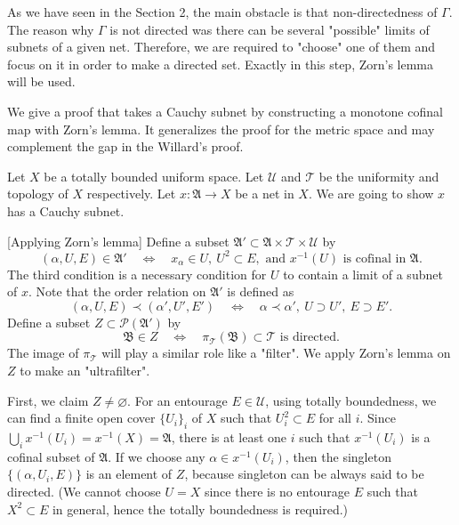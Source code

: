 \documentclass[11pt]{amsart}
\begin{document}
As we have seen in the Section 2, the main obstacle is that non-directedness of $\Gamma$.
The reason why $\Gamma$ is not directed was there can be several "possible" limits of subnets of a given net.
Therefore, we are required to "choose" one of them and focus on it in order to make a directed set.
Exactly in this step, Zorn's lemma will be used.
 
We give a proof that takes a Cauchy subnet by constructing a monotone cofinal map with Zorn's lemma.
It generalizes the proof for the metric space and may complement the gap in the Willard's proof.

\begin{pf}[1 of Theorem 1.1]
Let $X$ be a totally bounded uniform space.
Let $\mathcal{U}$ and $\mathcal{T}$ be the uniformity and topology of $X$ respectively.
Let $x:\mathfrak{A}\to X$ be a net in $X$.
We are going to show $x$ has a Cauchy subnet.

[Applying Zorn's lemma]
Define a subset $\mathfrak{A}'\subset\mathfrak{A}\times\mathcal{T}\times\mathcal{U}$ by
\[(\alpha,U,E)\in\mathfrak{A}'\quad\Leftrightarrow\quad x_\alpha\in U,\ U^2\subset E,\text{ and }x^{-1}(U)\text{ is cofinal in }\mathfrak{A}.\]
The third condition is a necessary condition for $U$ to contain a limit of a subnet of $x$.
Note that the order relation on $\mathfrak{A}'$ is defined as
\[(\alpha,U,E)\prec(\alpha',U',E')\quad\Leftrightarrow\quad \alpha\prec\alpha',\ U\supset U',\ E\supset E'.\]
Define a subset $Z\subset\mathcal{P}(\mathfrak{A}')$ by
\[\mathfrak{B}\in Z\quad\Leftrightarrow\quad\pi_\mathcal{T}(\mathfrak{B})\subset\mathcal{T}\text{ is directed}.\]
The image of $\pi_\mathcal{T}$ will play a similar role like a "filter".
We apply Zorn's lemma on $Z$ to make an "ultrafilter".

First, we claim $Z\ne\varnothing$.
For an entourage $E\in\mathcal{U}$, using totally boundedness, we can find a finite open cover $\{U_i\}_i$ of $X$ such that $U_i^2\subset E$ for all $i$.
Since $\bigcup_ix^{-1}(U_i)=x^{-1}(X)=\mathfrak{A}$, there is at least one $i$ such that $x^{-1}(U_i)$ is a cofinal subset of $\mathfrak{A}$.
If we choose any $\alpha\in x^{-1}(U_i)$, then the singleton $\{(\alpha,U_i,E)\}$ is an element of $Z$, because singleton can be always said to be directed.
(We cannot choose $U=X$ since there is no entourage $E$ such that $X^2\subset E$ in general, hence the totally boundedness is required.)


\end{pf}
\end{document}
